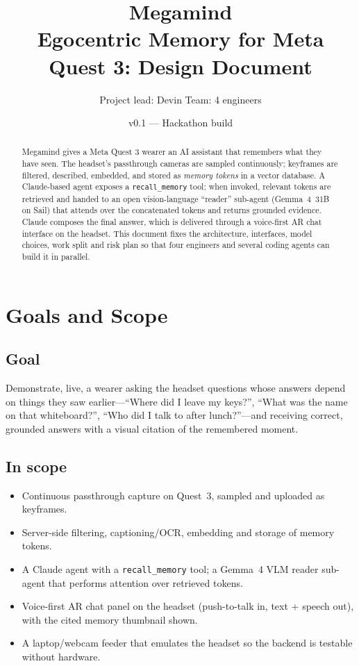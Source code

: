 \documentclass[11pt,a4paper]{article}
\title{\textbf{\color{mmblue}Megamind}\\[4pt]\large Egocentric Memory for Meta Quest 3: Design Document}
\author{Project lead: Devin \quad\textperiodcentered\quad Team: 4 engineers}
\date{v0.1 --- Hackathon build}
\begin{document}
\maketitle
\thispagestyle{empty}

\begin{abstract}
\noindent Megamind gives a Meta Quest 3 wearer an AI assistant that remembers what they have seen. The headset's passthrough cameras are sampled continuously; keyframes are filtered, described, embedded, and stored as \emph{memory tokens} in a vector database. A Claude-based agent exposes a \texttt{recall\_memory} tool; when invoked, relevant tokens are retrieved and handed to an open vision-language ``reader'' sub-agent (Gemma~4~31B on Sail) that attends over the concatenated tokens and returns grounded evidence. Claude composes the final answer, which is delivered through a voice-first AR chat interface on the headset. This document fixes the architecture, interfaces, model choices, work split and risk plan so that four engineers and several coding agents can build it in parallel.
\end{abstract}

\tableofcontents
\newpage

\section{Goals and Scope}

\subsection{Goal}
Demonstrate, live, a wearer asking the headset questions whose answers depend on things they saw earlier---``Where did I leave my keys?'', ``What was the name on that whiteboard?'', ``Who did I talk to after lunch?''---and receiving correct, grounded answers with a visual citation of the remembered moment.

\subsection{In scope}
\begin{itemize}
  \item Continuous passthrough capture on Quest~3, sampled and uploaded as keyframes.
  \item Server-side filtering, captioning/OCR, embedding and storage of memory tokens.
  \item A Claude agent with a \texttt{recall\_memory} tool; a Gemma~4 VLM reader sub-agent that performs attention over retrieved tokens.
  \item Voice-first AR chat panel on the headset (push-to-talk in, text + speech out), with the cited memory thumbnail shown.
  \item A laptop/webcam feeder that emulates the headset so the backend is testable without hardware.
\end{itemize}
\end{document}
